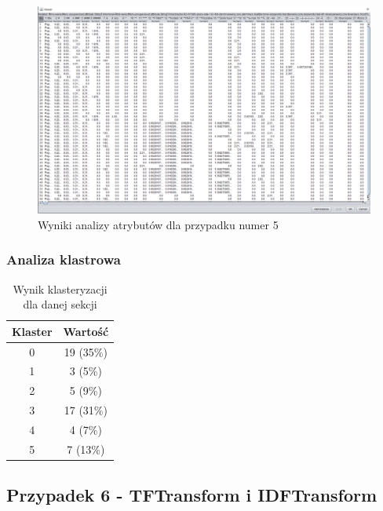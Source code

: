 \documentclass[../EDI_Task2_Karwowski_Kowalewski.tex]{subfiles}
\begin{document}
{{{            \begin{figure}[!htbp]
                \centering
                \includegraphics[width=\textwidth]{img/results1/ftims-case5.png}
                \caption{Wyniki analizy atrybutów dla przypadku numer 5}
            \end{figure}
            \FloatBarrier
        }

        \subsubsection{Analiza klastrowa} {

            \begin{table}[!htbp]
                \small
                \centering
                \begin{tabular}{|c|c|}
                    \hline
                    Klaster & Wartość \\ \hline
                    0   &  19 (35\%) \\
                    1   &   3 (5\%) \\
                    2   &   5 (9\%) \\
                    3   &  17 (31\%) \\
                    4   &   4 (7\%) \\
                    5   &   7 (13\%) \\ \hline
                \end{tabular}
                \caption{Wynik klasteryzacji dla danej sekcji}
            \end{table}
            \FloatBarrier
        }
    }

    \subsection{Przypadek 6 - TFTransform i IDFTransform} {

}}
\end{document}
